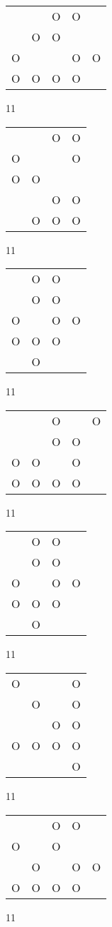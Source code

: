 \begin{tabular}{|m{0.2cm}m{0.2cm}m{0.2cm}m{0.2cm}m{0.2cm}|}\hline
 & &O&O& \\
 &O&O& & \\
O& & &O&O\\
O&O&O&O& \\
\hline\end{tabular}11
\begin{tabular}{|m{0.2cm}m{0.2cm}m{0.2cm}m{0.2cm}|}\hline
 & &O&O\\
O& & &O\\
O&O& & \\
 & &O&O\\
 &O&O&O\\
\hline\end{tabular}11
\begin{tabular}{|m{0.2cm}m{0.2cm}m{0.2cm}m{0.2cm}|}\hline
 &O&O& \\
 &O&O& \\
O& &O&O\\
O&O&O& \\
 &O& & \\
\hline\end{tabular}11
\begin{tabular}{|m{0.2cm}m{0.2cm}m{0.2cm}m{0.2cm}m{0.2cm}|}\hline
 & &O& &O\\
 & &O&O& \\
O&O& &O& \\
O&O&O&O& \\
\hline\end{tabular}11
\begin{tabular}{|m{0.2cm}m{0.2cm}m{0.2cm}m{0.2cm}|}\hline
 &O&O& \\
 &O&O& \\
O& &O&O\\
O&O&O& \\
 &O& & \\
\hline\end{tabular}11
\begin{tabular}{|m{0.2cm}m{0.2cm}m{0.2cm}m{0.2cm}|}\hline
O& & &O\\
 &O& &O\\
 & &O&O\\
O&O&O&O\\
 & & &O\\
\hline\end{tabular}11
\begin{tabular}{|m{0.2cm}m{0.2cm}m{0.2cm}m{0.2cm}m{0.2cm}|}\hline
 & &O&O& \\
O& &O& & \\
 &O& &O&O\\
O&O&O&O& \\
\hline\end{tabular}11
